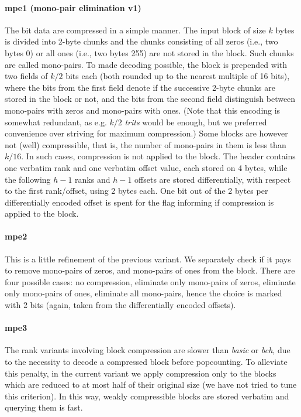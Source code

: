 \documentclass{llncs}
\begin{document}
\paragraph*{\textbf{mpe1 (mono-pair elimination v1)}}
The bit data are compressed in a simple manner. 
The input block of size $k$ bytes is divided into 2-byte chunks 
and the chunks consisting of all zeros (i.e., two bytes 0) 
or all ones (i.e., two bytes 255) are not stored in the block. 
Such chunks are called mono-pairs.
To made decoding possible, the block is prepended with 
two fields of $k/2$ bits each 
(both rounded up to the nearest multiple of 16 bits), 
where the bits from the first field denote if the successive 2-byte chunks 
are stored in the block or not, 
and the bits from the second field distinguish between mono-pairs with 
zeros and mono-pairs with ones.
(Note that this encoding is somewhat redundant, as e.g. $k/2$ {\em trits} 
would be enough, but we preferred convenience over 
striving for maximum compression.)
Some blocks are however not (well) compressible, that is, 
the number of mono-pairs in them is less than $k / 16$.
In such cases, compression is not applied to the block.
The header contains one verbatim rank and one verbatim offset value, each 
stored on 4 bytes, 
while the following $h-1$ ranks and $h-1$ offsets are stored differentially, 
with respect to the first rank/offset, using 2 bytes each.
One bit out of the 2 bytes per differentially encoded offset is spent for the 
flag informing if compression is applied to the block.


\paragraph*{\textbf{mpe2}}
This is a little refinement of the previous variant. 
We separately check if it pays to remove mono-pairs of zeros, 
and mono-pairs of ones from the block.
There are four possible cases: 
no compression, 
eliminate only mono-pairs of zeros, 
eliminate only mono-pairs of ones, 
eliminate all mono-pairs, 
hence the choice is marked with 2 bits 
(again, taken from the differentially encoded offsets).


\paragraph*{\textbf{mpe3}}
The rank variants involving block compression are slower than 
{\em basic} or {\em bch}, due to the necessity to 
decode a compressed block before popcounting. 
To alleviate this penalty, in the current variant we apply compression 
only to the blocks which are reduced to at most half of their 
original size (we have not tried to tune this criterion).
In this way, weakly compressible blocks are stored verbatim 
and querying them is fast.
\end{document}
